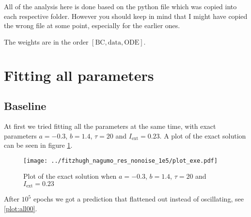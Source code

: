 \documentclass[a4paper]{article}
\begin{document}
	

All of the analysis here is done based on the python file which was copied into each respective folder. However you should keep in mind that I might have copied the wrong file at some point, especially for the earlier ones.

The weights are in the order $\left[ \text{BC}, \text{data}, \text{ODE} \right]$.
 

\section{Fitting all parameters}

\subsection{Baseline}

At first we tried fitting all the parameters at the same time, with exact parameters $a=-0.3$, $b=1.4$, $\tau=20$ and $ I_{\text{ext}}=0.23$. A plot of the exact solution can be seen in figure \ref{plot:exe}.

\begin{figure}[H]
	\centering 
	\texttt{[image: ../fitzhugh\_nagumo\_res\_nonoise\_1e5/plot\_exe.pdf]}
	\caption{Plot of the exact solution when $a=-0.3$, $b=1.4$, $\tau=20$ and $ I_{\text{ext}}=0.23$}
	\label{plot:exe}
\end{figure}


After $10^5$ epochs we got a prediction that flattened out instead of oscillating, see \ref{plot:all00}. 
\end{document}
